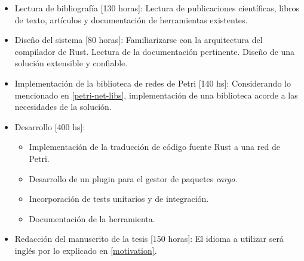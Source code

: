 \documentclass[12pt]{article}
\begin{document}
\begin{itemize}
    \item Lectura de bibliografía [130 horas]: Lectura de publicaciones científicas, libros de texto, artículos y documentación de herramientas existentes.
    \item Diseño del sistema [80 horas]: Familiarizarse con la arquitectura del compilador de Rust. Lectura de la documentación pertinente. Diseño de una solución extensible y confiable.
    \item Implementación de la biblioteca de redes de Petri [140 hs]: Considerando lo mencionado en \ref{petri-net-libs}, implementación de una biblioteca acorde a las necesidades de la solución.
    \item Desarrollo [400 hs]:
          \begin{itemize}
              \item Implementación de la traducción de código fuente Rust a una red de Petri.
              \item Desarrollo de un plugin para el gestor de paquetes \textit{cargo}.
              \item Incorporación de tests unitarios y de integración.
              \item Documentación de la herramienta.
          \end{itemize}
    \item Redacción del manuscrito de la tesis [150 horas]: El idioma a utilizar será inglés por lo explicado en \ref{motivation}.
\end{itemize}

\bigskip



\end{document}
